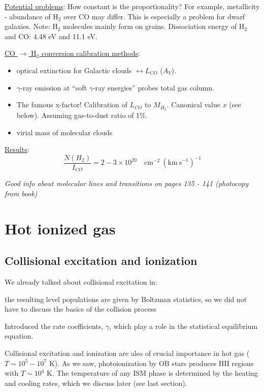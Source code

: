 \documentclass[12pt]{article}
\newcommand{\mar}[1]{\hspace{0pt}\marginpar{-\textcolor{black}{#1}-}}
\newcommand{\mynotes}[1]{{\fontfamily{cmss}\selectfont \textit{#1}}}
\let\oldsection\section
\renewcommand\section{\clearpage\oldsection}
\begin{document}
\underline{Potential problems}:
How constant is the proportionality? For example, metallicity -
abundance of H$_{2}$ over CO may differ. This is especially a problem
for dwarf galaxies. Note: H$_{2}$ molecules mainly form on grains.
Dissociation energy of H$_{2}$ and CO: 4.48 eV and 11.1 eV.

\underline{CO $\rightarrow$ H$_{2}$ conversion calibration methods}:
\begin{itemize}
    \item optical extinction for Galactic clouds $\leftrightarrow L_{CO}$
        ($A_{V}$).
    \item $\gamma$-ray emission at ``soft $\gamma$-ray energies'' probes
        total gas column.
    \item The famous x-factor! Calibration of $L_{CO}$ to $M_{H_{2}}$.
        Canonical value $x$ (see below).
        Assuming gas-to-dust ratio of 1\%.
    \item virial mass of molecular clouds
\end{itemize}

\underline{Results}:
\[
    \frac{N(H_{2})}{I_{CO}} = 2\!-\!3 \times 10^{20}\quad
    \mathrm{cm}^{-2}\
    (\mathrm{km\ s}^{-1})^{-1}
    \]

\mynotes{Good info about molecular lines and transitions on pages
135 - 141 (photocopy from book)}

\newpage
\section{Hot ionized gas}
\subsection{Collisional excitation and ionization}
\mar{142}We already talked about collisional excitation in:
\begin{description}[labelwidth=5em, leftmargin=8em]
    \item [HI] the resulting level populations are given by Boltzman
        statistics, so we did not have to discuss the basics of the
        collision process
    \item [HII regions] Introduced the rate coefficients, $\gamma$,
        which play a role in the statistical equilibrium equation.
\end{description}
Collisional excitation and ionization are also of crucial importance in hot
gas ($T \sim 10^{5} - 10^{7}$ K). As we saw, photoionization by OB stars
produces HII regions with $T \sim 10^{4}$ K. The temperature of any ISM
phase is determined by the heating and cooling rates, which we discuss
later (see last section).
\end{document}
